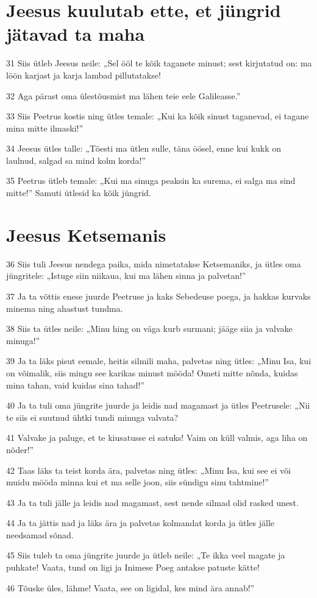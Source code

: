 \section*{Jeesus kuulutab ette, et jüngrid jätavad ta maha}

\par 31 Siis ütleb Jeesus neile: „Sel ööl te kõik taganete minust; sest kirjutatud on: ma löön karjast ja karja lambad pillutatakse!
\par 32 Aga pärast oma ülestõusmist ma lähen teie eele Galileasse.”
\par 33 Siis Peetrus kostis ning ütles temale: „Kui ka kõik sinust taganevad, ei tagane mina mitte ilmaski!”
\par 34 Jeesus ütles talle: „Tõesti ma ütlen sulle, täna öösel, enne kui kukk on laulnud, salgad sa mind kolm korda!”
\par 35 Peetrus ütleb temale: „Kui ma sinuga peaksin ka surema, ei salga ma sind mitte!” Samuti ütlesid ka kõik jüngrid.

\section*{Jeesus Ketsemanis}

\par 36 Siis tuli Jeesus nendega paika, mida nimetatakse Ketsemaniks, ja ütles oma jüngritele: „Istuge siin niikaua, kui ma lähen sinna ja palvetan!”
\par 37 Ja ta võttis enese juurde Peetruse ja kaks Sebedeuse poega, ja hakkas kurvaks minema ning ahastust tundma.
\par 38 Siis ta ütles neile: „Minu hing on väga kurb surmani; jääge siia ja valvake minuga!”
\par 39 Ja ta läks pisut eemale, heitis silmili maha, palvetas ning ütles: „Minu Isa, kui on võimalik, siis mingu see karikas minust mööda! Ometi mitte nõnda, kuidas mina tahan, vaid kuidas sina tahad!”
\par 40 Ja ta tuli oma jüngrite juurde ja leidis nad magamast ja ütles Peetrusele: „Nii te siis ei suutnud ühtki tundi minuga valvata?
\par 41 Valvake ja paluge, et te kiusatusse ei satuks! Vaim on küll valmis, aga liha on nõder!”
\par 42 Taas läks ta teist korda ära, palvetas ning ütles: „Minu Isa, kui see ei või muidu mööda minna kui et ma selle joon, siis sündigu sinu tahtmine!”
\par 43 Ja ta tuli jälle ja leidis nad magamast, sest nende silmad olid rasked unest.
\par 44 Ja ta jättis nad ja läks ära ja palvetas kolmandat korda ja ütles jälle needsamad sõnad.
\par 45 Siis tuleb ta oma jüngrite juurde ja ütleb neile: „Te ikka veel magate ja puhkate! Vaata, tund on ligi ja Inimese Poeg antakse patuste kätte!
\par 46 Tõuske üles, lähme! Vaata, see on ligidal, kes mind ära annab!”

